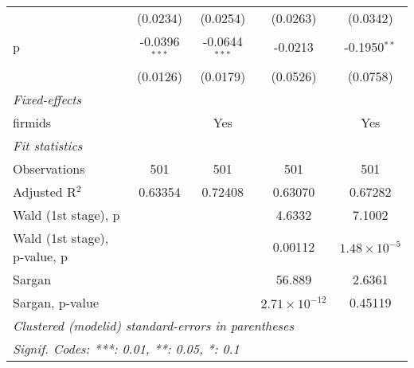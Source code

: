 \begin{table}[htbp]
\begin{tabular}{lcccc}
                                   & (0.0234)        & (0.0254)        & (0.0263)               & (0.0342)\\   
      p                            & -0.0396$^{***}$ & -0.0644$^{***}$ & -0.0213                & -0.1950$^{**}$\\   
                                   & (0.0126)        & (0.0179)        & (0.0526)               & (0.0758)\\   
      \midrule
      \emph{Fixed-effects}\\
      firmids                      &                 & Yes             &                        & Yes\\  
      \midrule
      \emph{Fit statistics}\\
      Observations                 & 501             & 501             & 501                    & 501\\  
      Adjusted R$^2$               & 0.63354         & 0.72408         & 0.63070                & 0.67282\\  
      Wald (1st stage), p          &                 &                 & 4.6332                 & 7.1002\\  
      Wald (1st stage), p-value, p &                 &                 & 0.00112                & $1.48\times 10^{-5}$\\   
      Sargan                       &                 &                 & 56.889                 & 2.6361\\  
      Sargan, p-value              &                 &                 & $2.71\times 10^{-12}$  & 0.45119\\  
      \midrule \midrule
      \multicolumn{5}{l}{\emph{Clustered (modelid) standard-errors in parentheses}}\\
      \multicolumn{5}{l}{\emph{Signif. Codes: ***: 0.01, **: 0.05, *: 0.1}}\\
   \end{tabular}
\end{table}


